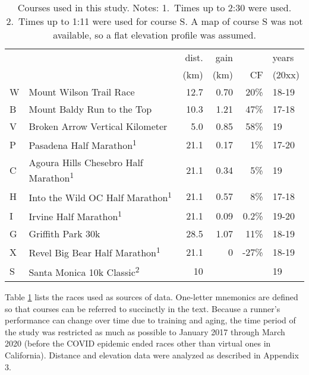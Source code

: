 \documentclass[10pt,letterpaper]{article}
\begin{document}
\begin{table}[h]\label{table:courses}
\caption{Courses used in this study. Notes: 1.~Times up to 2:30 were used. 
2.~Times up to 1:11 were used for course S. A map of course S was not available, so a flat elevation profile was
assumed.
}
\begin{tabular}{lp{60mm}rrrl}
                 &       & dist.  & gain &  &  years \\
                 &       & (km)      &  (km) & CF & (20xx) \\
W & Mount Wilson Trail Race         & 12.7 & 0.70 & 20\%        & 18-19\\
B & Mount Baldy Run to the Top      & 10.3 & 1.21 & 47\%        & 17-18\\
V & Broken Arrow Vertical Kilometer & 5.0  & 0.85 & 58\%        & 19 \\
P & Pasadena Half Marathon\textsuperscript{1}
                                    & 21.1 & 0.17 & 1\%         & 17-20 \\
C & Agoura Hills Chesebro Half Marathon\textsuperscript{1}
                                    & 21.1 & 0.34 & 5\%     & 19 \\
H & Into the Wild OC Half Marathon\textsuperscript{1}
                                    & 21.1 & 0.57 & 8\% & 17-18\\
I & Irvine Half Marathon\textsuperscript{1}
                                    & 21.1 & 0.09 & 0.2\% & 19-20\\
G & Griffith Park 30k
                                    & 28.5 & 1.07 & 11\%        & 18-19 \\
X & Revel Big Bear Half Marathon\textsuperscript{1}
                                    & 21.1 & 0    & -27\% & 18-19 \\
S & Santa Monica 10k Classic\textsuperscript{2}        & 10 & & & 19\\
\end{tabular}
\label{table:courses}
\end{table}

Table \ref{table:courses} lists the races used as sources of data.
One-letter mnemonics are defined so that courses can be referred to succinctly in the text.
Because a runner's performance can change over time due to training and aging,
the time period of the study was restricted as much as possible to January 2017 through March 2020
(before the COVID epidemic ended races other than virtual ones in California).
Distance and elevation data were analyzed as described in Appendix 3.
\end{document}
